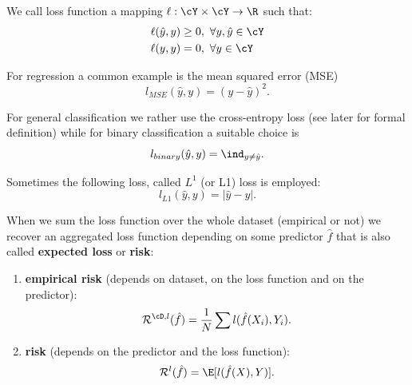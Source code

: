 \begin{definition}
We call loss function a mapping $\ell : \cY \times \cY \to \R$ such that:
\begin{align}
\ell(\hat{y}, y) &\ge 0,\ \forall y, \hat{y} \in \cY \label{eq:ch2-lossnonneg} \\
\ell(y, y) &= 0,\ \forall y \in \cY \label{eq:ch2-losszero}
\end{align}
\end{definition}

\begin{example}
For regression a common example is the mean squared error
(MSE)
\begin{equation}\label{eq:ch2-mse}
l_{MSE}(\hat{y}, y) = (y - \hat{y})^2.
\end{equation}
\end{example}

\begin{example}
For general classification we rather use the cross-entropy loss
(see later for formal definition) while for binary classification a suitable choice
is
\begin{equation}\label{eq:ch2-binary}
l_{binary}(\hat{y}, y) = \ind_{y \neq \hat{y}}.
\end{equation}
\end{example}

\begin{example}
Sometimes the following loss, called $L^1$ (or L1) loss is employed:
\begin{equation}\label{eq:ch2-l1}
l_{L1}(\hat{y}, y) = |\hat{y} - y|.
\end{equation}
\end{example}

When we sum the loss function over the whole dataset (empirical or not)
we recover an aggregated loss function depending on some predictor $\hat{f}$ that is
also called \textbf{expected loss} or \textbf{risk}:
\begin{enumerate}
  \item \textbf{empirical risk} (depends on dataset, on the loss function and on the predictor):
  \begin{equation}\label{eq:ch2-emprisk}
  \mathcal{R}^{\cD, l}(\hat{f}) = \frac{1}{N} \sum l(\hat{f}(X_i), Y_i).
  \end{equation}
  \item \textbf{risk} (depends on the predictor and the loss function):
  \begin{equation}\label{eq:ch2-risk}
  \mathcal{R}^{l}(\hat{f}) = \E[l(\hat{f}(X), Y)].
  \end{equation}
\end{enumerate}

